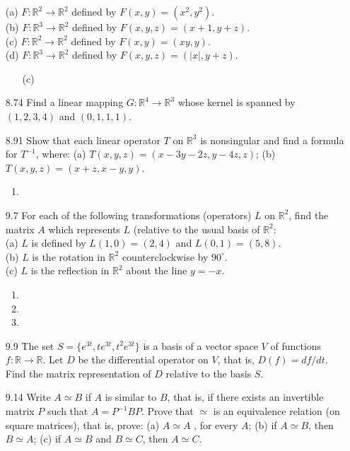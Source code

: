 \documentclass[12pt]{article}
\theoremstyle{plain}
\theoremstyle{definition}
\theoremstyle{plain}
\begin{document}
\begin{enumerate}
(a) $F:\mathbb{R}^2\rightarrow\mathbb{R}^2$ defined by $F(x,y)=(x^2,y^2)$.\\
(b) $F:\mathbb{R}^3\rightarrow\mathbb{R}^2$ defined by $F(x,y,z)=(x+1,y+z)$.\\
(c) $F:\mathbb{R}^2\rightarrow\mathbb{R}^2$ defined by $F(x,y)=(xy,y)$.\\
(d) $F:\mathbb{R}^3\rightarrow\mathbb{R}^2$ defined by $F(x,y,z)=(|x|,y+z)$.
	\begin{enumerate}
	\item[(c)]
	\end{enumerate}
\item[8.74]Find a linear mapping $G:\mathbb{R}^4\rightarrow\mathbb{R}^3$ whose kernel is spanned by $(1,2,3,4)$ and $(0,1,1,1)$.
\item[8.91]Show that each linear operator $T$ on $\mathbb{R}^3$ is nonsingular and find a formula for $T^{-1}$, where: (a) $T(x,y,z)=(x-3y-2z,y-4z,z)$; (b) $T(x,y,z)=(x+z,x-y,y)$.
	\begin{enumerate}
	\item
	\end{enumerate}
\item[9.7]For each of the following transformations (operators) $L$ on $\mathbb{R}^2$, find the matrix $A$ which represents $L$ (relative to the usual basis of $\mathbb{R}^2$:\\
(a) $L$ is defined by $L(1,0)=(2,4)$ and $L(0,1)=(5,8)$.\\
(b) $L$ is the rotation in $\mathbb{R}^2$ counterclockwise by $90^\circ$.\\
(c) $L$ is the reflection in $\mathbb{R}^2$ about the line $y=-x$.
	\begin{enumerate}
	\item
	\item
	\item
	\end{enumerate}
\item[9.9]The set $S=\{e^{3t},te^{3t},t^2e^{3t}\}$ is a basis of a vector space $V$ of functions $f: \mathbb{R}\rightarrow\mathbb{R}$. Let $D$ be the differential operator on $V$, that is, $D(f)=df/dt$. Find the matrix representation of $D$ relative to the basis $S$.
\item[9.14]Write $A\simeq B$ if $A$ is similar to $B$, that is, if there exists an invertible matrix $P$ such that $A=P^{-1}BP$. Prove that $\simeq$ is an equivalence relation (on square matrices), that is, prove: (a) $A\simeq A$ , for every $A$; (b) if $A \simeq B$, then $B\simeq A$; (c) if $A\simeq B$ and $B\simeq C$, then $A\simeq C$.\\


\end{enumerate}
\end{document}
